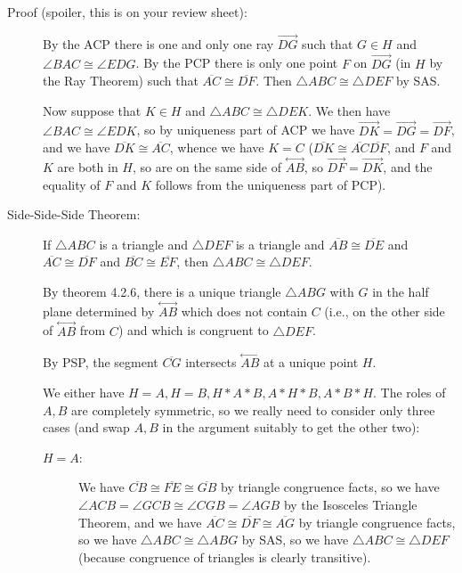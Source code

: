 \documentclass[12pt]{article}
\newcommand\Line[1]{\overset{\leftrightarrow}{#1}}
\begin{document}
\begin{description}
\item[Proof (spoiler, this is on your review sheet):]  By the ACP there is one and only one ray $\overrightarrow{DG}$ such that $G \in H$ and $\angle BAC \cong \angle EDG$.  By the PCP there
is only one point $F$ on $\overrightarrow{DG}$ (in $H$ by the Ray Theorem)  such that $\overline{AC} \cong \overline{DF}$.  Then $\triangle{ABC}\cong \triangle{DEF}$ by SAS.

Now suppose that $K \in H$ and $\triangle{ABC} \cong \triangle DEK$.  We then have $\angle BAC \cong \angle EDK$, so by uniqueness part of ACP we have
$\overrightarrow{DK} = \overrightarrow{DG} = \overrightarrow{DF}$, and we have $\overline{DK} \cong \overline{AC}$, whence we have $K=C$ ($\overline{DK} \cong \overline{AC} \overline{DF}$, and $F$ and $K$ are both in $H$, so are on the same side of $\Line{AB}$, so $\overrightarrow{DF} = \overrightarrow{DK}$, and the equality of $F$ and $K$ follows from the uniqueness part of PCP).

\item[Side-Side-Side Theorem:]  If $\triangle ABC$ is a triangle and $\triangle{DEF}$ is a triangle and $\overline{AB} \cong \overline{DE}$ and $\overline{AC} \cong \overline{DF}$ and $\overline{BC} \cong \overline{EF}$, then $\triangle ABC \cong \triangle{DEF}$.

By theorem 4.2.6, there is a unique triangle $\triangle ABG$ with $G$ in the half plane determined by $\Line{AB}$ which does not contain $C$ (i.e., on the other side of $\Line{AB}$ from $C$) and which is congruent to $\triangle DEF$.

By PSP, the segment $\overline{CG}$ intersects $\Line{AB}$ at a unique point $H$.

We either have $H=A, H=B, H*A*B, A*H*B, A*B*H$.  The roles of $A,B$ are completely symmetric, so we really need to consider only three cases (and swap $A,B$ in the argument suitably to get the other two):

\begin{description}

\item[$H=A$:]  We have $\overline{CB} \cong \overline{FE} \cong \overline{GB}$ by triangle congruence facts, so we have $\angle ACB = \angle GCB \cong \angle CGB =  \angle AGB$ by the Isosceles Triangle Theorem, and we have $\overline{AC} \cong \overline{DF} \cong \overline{AG}$ by triangle congruence facts, so we have $\triangle ABC \cong \triangle{ABG}$ by SAS, so we have $\triangle ABC \cong \triangle DEF$ (because congruence of triangles is clearly transitive).


\end{description}
\end{description}
\end{document}
